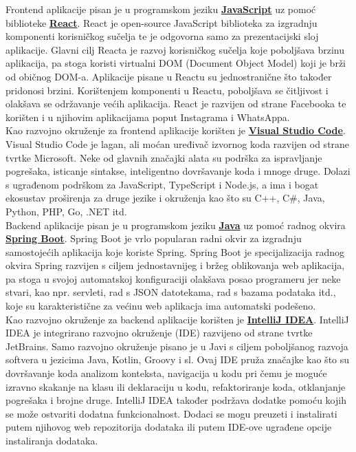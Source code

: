 			Frontend aplikacije pisan je u programskom jeziku \textbf{\href{https://www.javascript.com/}{JavaScript}} uz pomoć biblioteke \textbf{\href{https://reactjs.org/}{React}}. React je  open-source JavaScript biblioteka za izgradnju komponenti korisničkog sučelja te je odgovorna samo za prezentacijski sloj aplikacije. Glavni cilj Reacta je razvoj korisničkog sučelja koje poboljšava brzinu aplikacija, pa stoga koristi virtualni DOM (Document Object Model) koji je brži od običnog DOM-a. Aplikacije pisane u Reactu su jednostranične što također pridonosi brzini. Korištenjem komponenti u Reactu, poboljšava se čitljivost i olakšava se održavanje većih aplikacija. React je razvijen od strane Facebooka te korišten i u njihovim aplikacijama poput Instagrama i WhatsAppa.\\
			Kao razvojno okruženje za frontend aplikacije korišten je \textbf{\href{https://code.visualstudio.com/}{Visual Studio Code}}. Visual Studio Code je lagan, ali moćan uređivač izvornog koda razvijen od strane tvrtke Microsoft. Neke od glavnih značajki alata su podrška za ispravljanje pogrešaka, isticanje sintakse, inteligentno dovršavanje koda i mnoge druge. Dolazi s ugrađenom podrškom za JavaScript, TypeScript i Node.js, a ima i bogat ekosustav proširenja za druge jezike i okruženja kao što su C++, C\#, Java, Python, PHP, Go, .NET itd.\\
			Backend aplikacije pisan je u programskom jeziku \textbf{\href{https://www.java.com/en/}{Java}} uz pomoć radnog okvira \textbf{\href{https://spring.io/projects/spring-boot}{Spring Boot}}. Spring Boot je vrlo popularan radni okvir za izgradnju samostojećih aplikacija koje koriste Spring. Spring Boot je specijalizacija radnog okvira Spring razvijen s ciljem jednostavnijeg i bržeg oblikovanja web aplikacija, pa stoga u svojoj automatskoj konfiguraciji olakšava posao programeru jer neke stvari, kao npr. servleti, rad s JSON datotekama, rad s bazama podataka itd., koje su karakteristične za većinu web aplikacja ima automatski podešeno. \\
			Kao razvojno okruženje za backend aplikacije korišten je \textbf{\href{https://www.jetbrains.com/idea/}{IntelliJ IDEA}}. IntelliJ IDEA je integrirano razvojno okruženje (IDE) razvijeno od strane tvrtke JetBrains. Samo razvojno okruženje pisano je u Javi s ciljem poboljšanog razvoja softvera u jezicima Java, Kotlin, Groovy i sl. Ovaj IDE pruža značajke kao što su dovršavanje koda analizom konteksta, navigacija u kodu pri čemu je moguće izravno skakanje na klasu ili deklaraciju u kodu, refaktoriranje koda, otklanjanje pogrešaka i brojne druge. IntelliJ IDEA također podržava dodatke pomoću kojih se može ostvariti dodatna funkcionalnost. Dodaci se mogu preuzeti i instalirati putem njihovog web repozitorija dodataka ili putem IDE-ove ugrađene opcije instaliranja dodataka.\\
